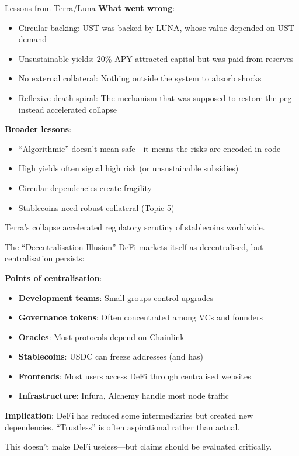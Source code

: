 \documentclass[10pt]{beamer}
\begin{document}
\begin{frame}{Lessons from Terra/Luna}
  \textbf{What went wrong}:
  \begin{itemize}
    \item Circular backing: UST was backed by LUNA, whose value depended on UST demand
    \item Unsustainable yields: 20\% APY attracted capital but was paid from reserves
    \item No external collateral: Nothing outside the system to absorb shocks
    \item Reflexive death spiral: The mechanism that was supposed to restore the peg instead accelerated collapse
  \end{itemize}
  
  \vspace{1em}
  \textbf{Broader lessons}:
  \begin{itemize}
    \item ``Algorithmic'' doesn't mean safe---it means the risks are encoded in code
    \item High yields often signal high risk (or unsustainable subsidies)
    \item Circular dependencies create fragility
    \item Stablecoins need robust collateral (Topic 5)
  \end{itemize}
  
  \vspace{0.5em}
  Terra's collapse accelerated regulatory scrutiny of stablecoins worldwide.
\end{frame}

\begin{frame}{The ``Decentralisation Illusion''}
  DeFi markets itself as decentralised, but centralisation persists:
  
  \vspace{1em}
  \textbf{Points of centralisation}:
  \begin{itemize}
    \item \textbf{Development teams}: Small groups control upgrades
    \item \textbf{Governance tokens}: Often concentrated among VCs and founders
    \item \textbf{Oracles}: Most protocols depend on Chainlink
    \item \textbf{Stablecoins}: USDC can freeze addresses (and has)
    \item \textbf{Frontends}: Most users access DeFi through centralised websites
    \item \textbf{Infrastructure}: Infura, Alchemy handle most node traffic
  \end{itemize}
  
  \vspace{1em}
  \textbf{Implication}: DeFi has reduced some intermediaries but created new dependencies. ``Trustless'' is often aspirational rather than actual.
  
  \vspace{0.5em}
  This doesn't make DeFi useless---but claims should be evaluated critically.
\end{frame}
\end{document}
